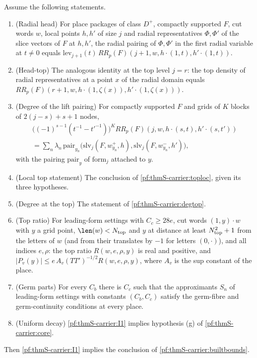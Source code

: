 \begin{theorem}\label{pf:thmS-carrier:builtleaves}
Assume the following statements.
\begin{enumerate}[label=(L\arabic*)]
\item (Radial head) For place packages of class $D^+$, compactly supported $F$, cut words $w$, local points $h,h'$ of size $j$
  and radial representatives $\Phi,\Phi'$ of the slice vectors of $F$ at $h,h'$, the radial pairing of $\Phi,\Phi'$ in the
  first radial variable at $t\ne0$ equals $\mathrm{lev}_{j+1}(t)\,RR_p(F)(j+1,w,h\cdot(1,t),h'\cdot(1,t))$.
\item (Head-top) The analogous identity at the top level $j=r$: the top density of radial representatives at a point $x$ of the
  radial domain equals $RR_p(F)(r+1,w,h\cdot(1,\zeta(x)),h'\cdot(1,\zeta(x)))$.
\item (Degree of the lift pairing) For compactly supported $F$ and grids of $K$ blocks of $2(j-s)+s+1$ nodes,
  \begin{multline*}
  \bigl((-1)^{s-1}(t^{-1}-t'^{-1})\bigr)^KRR_p(F)(j,w,h\cdot(s,t),h'\cdot(s,t'))\\
  =\sum_n\lambda_n\,\mathrm{pair}_{y_n}\bigl(\mathrm{slv}_j(F,w^+_{y_n},h),\mathrm{slv}_j(F,w^-_{y_n},h')\bigr),
  \end{multline*}
  with the pairing $\mathrm{pair}_y$ of $\mathrm{form}_j$ attached to $y$.
\item (Local top statement) The conclusion of \cref{pf:thmS-carrier:toploc}, given its three hypotheses.
\item (Degree at the top) The statement of \cref{pf:thmS-carrier:degtop}.
\item (Top ratio) For leading-form settings with $C_c\ge28e$, cut words $(1,y)\cdot w$ with $y$ a grid point,
  $\len(w)<\thmScarrierNtop$ and $y$ at distance at least $N_{\mathrm{top}}^2+1$ from the letters of $w$ (and from their
  translates by $-1$ for letters $(0,\cdot)$), and all indices $e,\rho$: the top ratio $R(w,e,\rho,y)$ is real and positive,
  and $|P_v(y)|\le e\,A_v(TT')^{-1/2}R(w,e,\rho,y)$, where $A_v$ is the sup constant of the place.
\item (Germ parts) For every $C_b$ there is $C_c$ such that the approximants $S_n$ of leading-form settings with constants
  $(C_b,C_c)$ satisfy the germ-fibre and germ-continuity conditions at every place.
\item (Uniform decay) \ref{pf:thmS-carrier:I1} implies hypothesis (g) of \cref{pf:thmS-carrier:core}.
\end{enumerate}
Then \ref{pf:thmS-carrier:I1} implies the conclusion of \cref{pf:thmS-carrier:builtbounds}.
\end{theorem}


